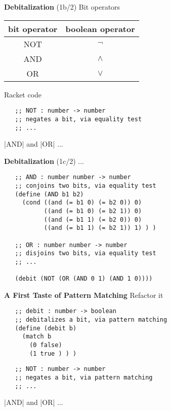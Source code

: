 \documentclass[12pt]{beamer}
\begin{document}
\begin{frame}[fragile]{{\bf Debitalization} (1b/2)}
 Bit operators
 \begin{table}
  \centering
  \begin{tabular}{|c|c|}
   \hline
   bit operator & boolean operator \\
   \hline
   NOT & $\neg$ \\
   \hline
   AND & $\wedge$ \\
   \hline
   OR  & $\vee$  \\
   \hline
  \end{tabular}
 \end{table}

 \pause
 
 Racket code
 {\footnotesize
  \begin{verbatim}
   ;; NOT : number -> number
   ;; negates a bit, via equality test
   ;; ...
  \end{verbatim}
 }

 \pause

 |AND| and |OR| ...
\end{frame}

\begin{frame}[fragile]{{\bf Debitalization} (1c/2)}
 ...

 \pause

 {\footnotesize
  \begin{verbatim}
   ;; AND : number number -> number
   ;; conjoins two bits, via equality test
   (define (AND b1 b2)
     (cond ((and (= b1 0) (= b2 0)) 0)
           ((and (= b1 0) (= b2 1)) 0)
           ((and (= b1 1) (= b2 0)) 0)
           ((and (= b1 1) (= b2 1)) 1) ) )

   ;; OR : number number -> number
   ;; disjoins two bits, via equality test
   ;; ...

   (debit (NOT (OR (AND 0 1) (AND 1 0))))
  \end{verbatim}
 }
\end{frame}

\begin{frame}[fragile]{\bf A First Taste of Pattern Matching}
 Refactor it
 {\footnotesize
  \begin{verbatim}
   ;; debit : number -> boolean
   ;; debitalizes a bit, via pattern matching
   (define (debit b)
     (match b
       (0 false)
       (1 true ) ) )
  \end{verbatim}
 }

 \pause

 {\footnotesize
  \begin{verbatim}
   ;; NOT : number -> number
   ;; negates a bit, via pattern matching
   ;; ...
  \end{verbatim}
 }

 \pause

 |AND| and |OR| ...
\end{frame}
\end{document}
